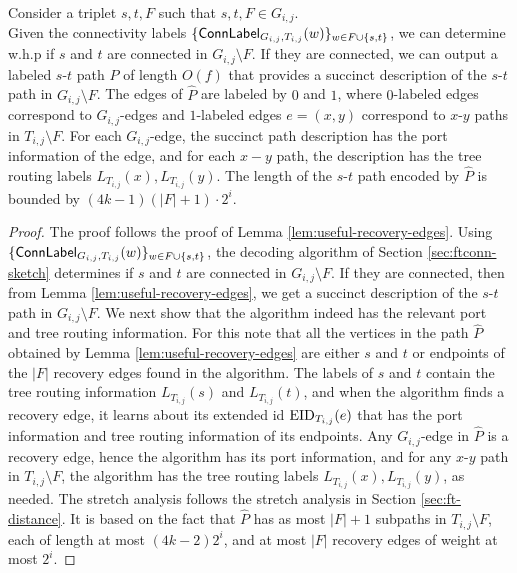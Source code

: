 \begin{lemma}\label{lem:succint_path_routing}
Consider a triplet $s,t,F$ such that $s,t,F \in G_{i,j}$. \\
Given the connectivity labels $\{\mathsf{ConnLabel}_{G_{i,j},T_{i,j}}(w)\}_{w \in F \cup \{s,t\}}$, we can determine w.h.p if $s$ and $t$ are connected in $G_{i,j} \setminus F$. If they are connected, we can output a labeled $s$-$t$ path $\widehat{P}$ of length $O(f)$ that provides a succinct description of the $s$-$t$ path in $G_{i,j} \setminus F$. The edges of $\widehat{P}$ are labeled by $0$ and $1$, where $0$-labeled edges correspond to $G_{i,j}$-edges and $1$-labeled edges $e=(x,y)$ correspond to $x$-$y$ paths in $T_{i,j} \setminus F$. For each $G_{i,j}$-edge, the succinct path description has the port information of the edge, and for each $x-y$ path, the description has the tree routing labels $L_{T_{i,j}}(x),L_{T_{i,j}}(y)$.
The length of the $s$-$t$ path encoded by $\widehat{P}$ is bounded by $(4k-1)(|F|+1)\cdot 2^i$. 
\end{lemma}

\begin{proof}
The proof follows the proof of Lemma \ref{lem:useful-recovery-edges}.
Using $\{\mathsf{ConnLabel}_{G_{i,j},T_{i,j}}(w)\}_{w \in F \cup \{s,t\}}$, the decoding algorithm of Section \ref{sec:ftconn-sketch} determines if $s$ and $t$ are connected in $G_{i,j} \setminus F$. If they are connected, then from Lemma \ref{lem:useful-recovery-edges}, we get a succinct description of the $s$-$t$ path in $G_{i,j} \setminus F$. We next show that the algorithm indeed has the relevant port and tree routing information. For this note that all the vertices in the path $\widehat{P}$ obtained by Lemma \ref{lem:useful-recovery-edges} are either $s$ and $t$ or endpoints of the $|F|$ recovery edges found in the algorithm. The labels of $s$ and $t$ contain the tree routing information $L_{T_{i,j}}(s)$ and $L_{T_{i,j}}(t)$, and when the algorithm finds a recovery edge, it learns about its extended id $\operatorname{EID}_{T_{i,j}}(e)$ that has the port information and tree routing information of its endpoints. Any $G_{i,j}$-edge in $\widehat{P}$ is a recovery edge, hence the algorithm has its port information, and for any $x$-$y$ path in $T_{i,j} \setminus F$, the algorithm has the tree routing labels $L_{T_{i,j}}(x),L_{T_{i,j}}(y)$, as needed.
The stretch analysis follows the stretch analysis in Section \ref{sec:ft-distance}. It is based on the fact that $\widehat{P}$ has as most $|F|+1$ subpaths in $T_{i,j} \setminus F$, each of length at most $(4k-2)2^i$, and at most $|F|$ recovery edges of weight at most $2^i$.
\end{proof}







